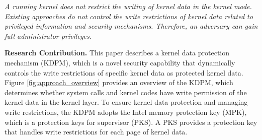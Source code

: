 {\it A running kernel does not restrict the writing of kernel data
in the kernel mode. 
%
Existing approaches do not control the write restrictions of kernel data related to
privileged information and security mechanisms. Therefore, an adversary can 
gain full administrator privileges.}
%


{\bf Research Contribution.}
This paper describes a kernel data protection mechanism (KDPM), which is
a novel security capability that dynamically controls the write restrictions of
specific kernel data as protected kernel data. 
Figure \ref{fig:approach_overview} provides an overview of the KDPM,
%
which determines whether system calls and kernel codes have write permission of
the kernel data in the kernel layer.
%
To ensure kernel data protection and managing write restrictions, the KDPM
adopts the Intel memory protection key (MPK), which is a protection keys for
supervisor (PKS).
%
A PKS provides a protection key that handles write restrictions for each page of
kernel data.

